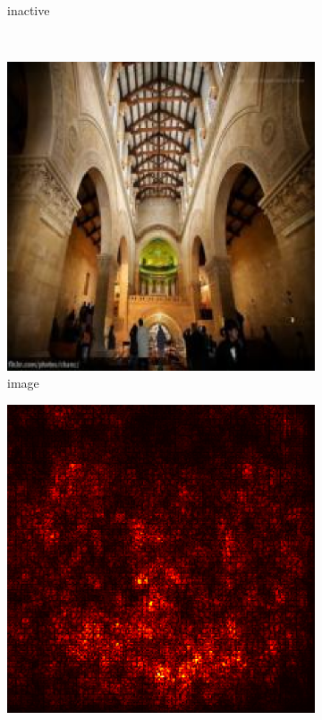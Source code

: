 \documentclass[preprint,12pt]{elsarticle}
\begin{document}
\begin{figure}
\begin{subfigure}{0.14\textwidth}
        \caption{inactive}
    \end{subfigure}\\
    \begin{subfigure}{0.14\linewidth}
        \centering
        \includegraphics[width=\linewidth]{../visualizations/examples/imagenette/resnet18/images/6.png}
        \caption{image}
    \end{subfigure}
    \hfill
    \begin{subfigure}{0.14\linewidth}
        \centering
        \includegraphics[width=\linewidth]{../visualizations/examples/imagenette/resnet18/saliency_map/6.png}

\end{subfigure}
\end{figure}
\end{document}
